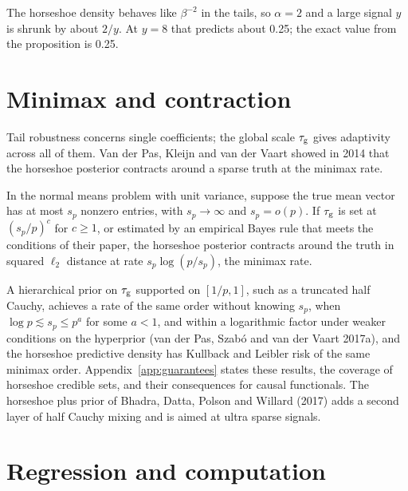 The horseshoe density behaves like $\beta^{-2}$ in the tails, so $\alpha = 2$ and a large signal $y$ is shrunk by about $2/y$. At $y = 8$ that predicts about 0.25; the exact value from the proposition is 0.25. 

\section{Minimax and contraction}

Tail robustness concerns single coefficients; the global scale $\tau_{\mathrm{g}}$ gives adaptivity across all of them. Van der Pas, Kleijn and van der Vaart showed in 2014 that the horseshoe posterior contracts around a sparse truth at the minimax rate.

\begin{theorem}
In the normal means problem with unit variance, suppose the true mean vector has at most $s_p$ nonzero entries, with $s_p \to \infty$ and $s_p = o(p)$. If $\tau_{\mathrm{g}}$ is set at $(s_p/p)^{c}$ for $c \geq 1$, or estimated by an empirical Bayes rule that meets the conditions of their paper, the horseshoe posterior contracts around the truth in squared $\ell_2$ distance at rate $s_p \log(p/s_p)$, the minimax rate.
\end{theorem}

A hierarchical prior on $\tau_{\mathrm{g}}$ supported on $[1/p,1]$, such as a truncated half Cauchy, achieves a rate of the same order without knowing $s_p$, when $\log p \lesssim s_p \le p^{a}$ for some $a < 1$, and within a logarithmic factor under weaker conditions on the hyperprior (van der Pas, Szab\'o and van der Vaart 2017a), and the horseshoe predictive density has Kullback and Leibler risk of the same minimax order. Appendix~\ref{app:guarantees} states these results, the coverage of horseshoe credible sets, and their consequences for causal functionals.  The horseshoe plus prior of Bhadra, Datta, Polson and Willard (2017) adds a second layer of half Cauchy mixing and is aimed at ultra sparse signals.

\section{Regression and computation}\label{sec:hsregression}

